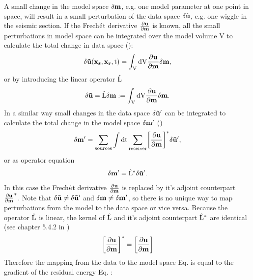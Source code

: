 A small change in the model space $\rm{\delta \mathbf{m}}$, e.g. one model parameter at one point in space, will result in a small 
perturbation of the data space $\rm{\delta \mathbf{\tilde{u}}}$, e.g. one wiggle in the seismic section. If the Frech$\rm{\acute{e}}$t derivative $\rm{\frac{\partial \mathbf{u}}{\partial \mathbf{m}}}$ is known, all 
the small perturbations in model space can be integrated over the model volume V to calculate the total change in data space
(\cite{tarantola:2005}):
\begin{equation}
\rm{\delta \mathbf{\tilde{u}}(\mathbf{x_s},\mathbf{x_r},t) = \int_V dV \frac{\partial \mathbf{u}}{\partial \mathbf{m}} \delta 
\mathbf{m},}
\label{2:4}
\end{equation} 
or by introducing the linear operator $\rm{\hat{L}}$
\begin{equation}
\rm{\delta \mathbf{\tilde{u}} = \hat{L} \delta \mathbf{m} := \int_V dV \frac{\partial \mathbf{u}}{\partial \mathbf{m}} \delta 
\mathbf{m}.\notag}
\label{2:4:1}
\end{equation} 
In a similar way small changes in the data space $\rm{\delta \mathbf{\tilde{u}}'}$ can be integrated to calculate the total change in the model 
space $\rm{\delta \mathbf{m}'}$ (\cite{tarantola:2005})
\begin{equation}
\rm{\delta \mathbf{m'} =  \sum_{sources} \int dt \sum_{receiver} \biggl[\frac{\partial \mathbf{u}}{\partial \mathbf{m}}\biggr]^* \delta
\mathbf{\tilde{u}}',}
\label{3:6}
\end{equation}
or as operator equation
\begin{equation}
\rm{\delta \mathbf{m'} = \hat{L}^* \delta \mathbf{\tilde{u}}'. \notag}
\label{3:6:1}
\end{equation}
In this case the Frech$\rm{\acute{e}}$t derivative $\rm{\frac{\partial \mathbf{u}}{\partial \mathbf{m}}}$ is replaced by it's adjoint 
counterpart $\rm{\frac{\partial \mathbf{u}}{\partial \mathbf{m}}^*}$. Note that $\rm{\delta
\mathbf{\tilde{u}} \ne \delta \mathbf{\tilde{u}}'}$ and $\rm{\delta \mathbf{m} \ne \delta \mathbf{m}'}$, so there is no unique way to map perturbations from the model to the data space or vice versa. Because the operator $\rm{\hat{L}}$ is linear, the kernel of $\rm{\hat{L}}$ and it's adjoint counterpart $\rm{\hat{L}^*}$ are identical (see chapter 5.4.2 in \cite{tarantola:2005})
\begin{equation}
\rm{\biggl[\frac{\partial \mathbf{u}}{\partial \mathbf{m}}\biggr]^* = \biggl[\frac{\partial \mathbf{u}}{\partial \mathbf{m}}\biggr]} \notag
\end{equation}
Therefore the mapping from the data to the model space Eq.  is equal to the gradient of the residual energy Eq. : 

